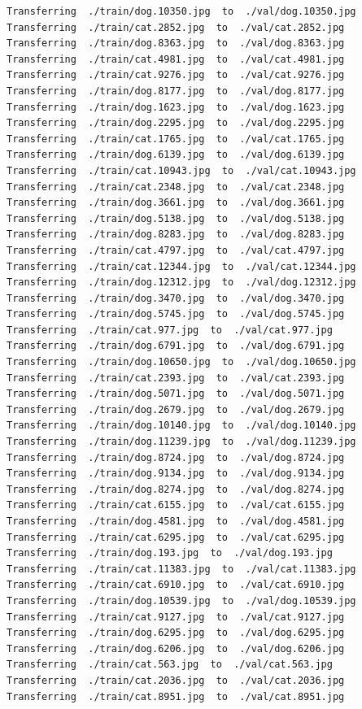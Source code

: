 \documentclass[]{book}
\theoremstyle{definition}
\theoremstyle{definition}
\theoremstyle{definition}
\theoremstyle{remark}
\begin{document}
\begin{verbatim}
Transferring  ./train/dog.10350.jpg  to  ./val/dog.10350.jpg
Transferring  ./train/cat.2852.jpg  to  ./val/cat.2852.jpg
Transferring  ./train/dog.8363.jpg  to  ./val/dog.8363.jpg
Transferring  ./train/cat.4981.jpg  to  ./val/cat.4981.jpg
Transferring  ./train/cat.9276.jpg  to  ./val/cat.9276.jpg
Transferring  ./train/dog.8177.jpg  to  ./val/dog.8177.jpg
Transferring  ./train/dog.1623.jpg  to  ./val/dog.1623.jpg
Transferring  ./train/dog.2295.jpg  to  ./val/dog.2295.jpg
Transferring  ./train/cat.1765.jpg  to  ./val/cat.1765.jpg
Transferring  ./train/dog.6139.jpg  to  ./val/dog.6139.jpg
Transferring  ./train/cat.10943.jpg  to  ./val/cat.10943.jpg
Transferring  ./train/cat.2348.jpg  to  ./val/cat.2348.jpg
Transferring  ./train/dog.3661.jpg  to  ./val/dog.3661.jpg
Transferring  ./train/dog.5138.jpg  to  ./val/dog.5138.jpg
Transferring  ./train/dog.8283.jpg  to  ./val/dog.8283.jpg
Transferring  ./train/cat.4797.jpg  to  ./val/cat.4797.jpg
Transferring  ./train/cat.12344.jpg  to  ./val/cat.12344.jpg
Transferring  ./train/dog.12312.jpg  to  ./val/dog.12312.jpg
Transferring  ./train/dog.3470.jpg  to  ./val/dog.3470.jpg
Transferring  ./train/dog.5745.jpg  to  ./val/dog.5745.jpg
Transferring  ./train/cat.977.jpg  to  ./val/cat.977.jpg
Transferring  ./train/dog.6791.jpg  to  ./val/dog.6791.jpg
Transferring  ./train/dog.10650.jpg  to  ./val/dog.10650.jpg
Transferring  ./train/cat.2393.jpg  to  ./val/cat.2393.jpg
Transferring  ./train/dog.5071.jpg  to  ./val/dog.5071.jpg
Transferring  ./train/dog.2679.jpg  to  ./val/dog.2679.jpg
Transferring  ./train/dog.10140.jpg  to  ./val/dog.10140.jpg
Transferring  ./train/dog.11239.jpg  to  ./val/dog.11239.jpg
Transferring  ./train/dog.8724.jpg  to  ./val/dog.8724.jpg
Transferring  ./train/dog.9134.jpg  to  ./val/dog.9134.jpg
Transferring  ./train/dog.8274.jpg  to  ./val/dog.8274.jpg
Transferring  ./train/cat.6155.jpg  to  ./val/cat.6155.jpg
Transferring  ./train/dog.4581.jpg  to  ./val/dog.4581.jpg
Transferring  ./train/cat.6295.jpg  to  ./val/cat.6295.jpg
Transferring  ./train/dog.193.jpg  to  ./val/dog.193.jpg
Transferring  ./train/cat.11383.jpg  to  ./val/cat.11383.jpg
Transferring  ./train/cat.6910.jpg  to  ./val/cat.6910.jpg
Transferring  ./train/dog.10539.jpg  to  ./val/dog.10539.jpg
Transferring  ./train/cat.9127.jpg  to  ./val/cat.9127.jpg
Transferring  ./train/dog.6295.jpg  to  ./val/dog.6295.jpg
Transferring  ./train/dog.6206.jpg  to  ./val/dog.6206.jpg
Transferring  ./train/cat.563.jpg  to  ./val/cat.563.jpg
Transferring  ./train/cat.2036.jpg  to  ./val/cat.2036.jpg
Transferring  ./train/cat.8951.jpg  to  ./val/cat.8951.jpg

\end{verbatim}
\end{document}
